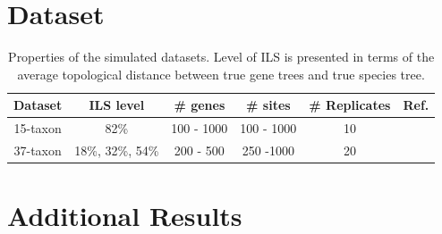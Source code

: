 \documentclass[10pt,a4paper]{article}
\begin{document}
\begin{appendices}



\section{Dataset}
\label{app:dataset}

\begin{table}[htbp]
\caption{Properties of the simulated datasets. Level of ILS is presented in terms of the average topological distance between true gene trees and true species tree.}
\label{table.data-description}
\centering
\begin{tabular}{c c c c c c} 
 \hline
 Dataset & ILS level & \# genes & \# sites & \# Replicates & Ref.\\  [0.5ex]
 \hline\hline
 15-taxon & 82\% & 100 - 1000 & 100 - 1000 & 10 & \cite{bayzid2015weighted}\\
 \hline
 37-taxon & 18\%, 32\%, 54\% & 200 - 500 & 250 -1000 & 20 & \cite{statistical-binning}\\
 \hline
 
\end{tabular}
\end{table}

\clearpage
\section{Additional Results}
\label{app:additional-results}


\end{appendices}
\end{document}
